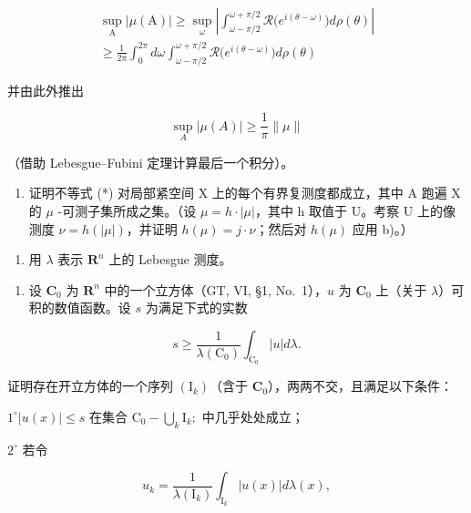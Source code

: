 \[
\begin{array}{l} \sup _ {\mathrm{A}} | \mu (\mathrm{A}) | \geqslant \sup _ {\omega} \left| \int_ {\omega - \pi / 2} ^ {\omega + \pi / 2} \mathcal {R} \big (e ^ {i (\theta - \omega)} \big) d \rho (\theta) \right| \\ \geqslant \frac {1}{2 \pi} \int_ {0} ^ {2 \pi} d \omega \int_ {\omega - \pi / 2} ^ {\omega + \pi / 2} \mathcal {R} \big (e ^ {i (\theta - \omega)} \big) d \rho (\theta) \end{array}
\]

并由此外推出

\[
\sup _ {A} | \mu (A) | \geqslant \frac {1}{\pi} \| \mu \|\tag{*}
\]

（借助 Lebesgue--Fubini 定理计算最后一个积分）。

\begin{enumerate}
\def\labelenumi{\alph{enumi})}
\setcounter{enumi}{2}
\tightlist
\item
  证明不等式 (*) 对局部紧空间 X 上的每个有界复测度都成立，其中 A 跑遍 X 的 \(\mu\) -可测子集所成之集。（设 \(\mu = h \cdot |\mu|\)，其中 h 取值于 U。考察 U 上的像测度 \(\nu = h(|\mu|)\)，并证明 \(h(\mu) = j \cdot \nu\)；然后对 \(h(\mu)\) 应用 b)。）
\end{enumerate}

\begin{enumerate}
\def\labelenumi{\arabic{enumi})}
\setcounter{enumi}{20}
\tightlist
\item
  用 \(\lambda\) 表示 \(\mathbf{R}^n\) 上的 Lebesgue 测度。
\end{enumerate}

\begin{enumerate}
\def\labelenumi{\alph{enumi})}
\tightlist
\item
  设 \(\mathbf{C}_0\) 为 \(\mathbf{R}^n\) 中的一个立方体（GT, VI, §1, No.~1），\(u\) 为 \(\mathbf{C}_0\) 上（关于 \(\lambda\)）可积的数值函数。设 \(s\) 为满足下式的实数
\end{enumerate}

\[
s \geqslant \frac {1}{\lambda (\mathrm{C} _ {0})} \int_ {\mathrm{C} _ {0}} | u | d \lambda .
\]

证明存在开立方体的一个序列 \((\mathrm{I}_k)\)（含于 \(\mathbf{C}_0\)），两两不交，且满足以下条件：

\(1^{\circ}\left|u(x)\right|\leqslant s\) 在集合 \(\mathrm{C_0 - }\bigcup_{k}\mathrm{I}_k;\) 中几乎处处成立；

\(2^{\circ}\) 若令

\[
u _ {k} = \frac {1}{\lambda (\mathrm{I} _ {k})} \int_ {\mathrm{I} _ {k}} | u (x) | d \lambda (x),
\]

